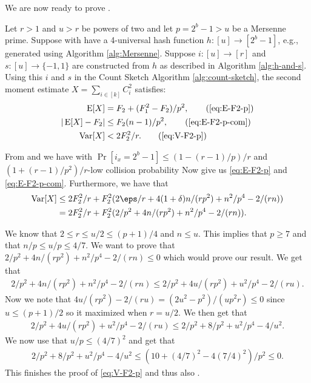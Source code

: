 We are now ready to prove .
\begingroup
    \def\thelemma{\ref{thm:h-and-s-p}}
    \begin{theorem}
        Let $r>1$ and $u>r$ be powers of two and let $p=2^b-1>u$ be a
        Mersenne prime.
        Suppose with have a 4-universal hash function $h:[u]\to[2^b-1]$, e.g.,
        generated using Algorithm \ref{alg:Mersenne}. Suppose
        $i:[u]\to[r]$ and
        $s:[u]\to\{-1,1\}$ are constructed from $h$ as described in
        Algorithm \ref{alg:h-and-s}. Using this $i$ and $s$ 
        in the Count Sketch Algorithm \ref{alg:count-sketch}, the second moment 
        estimate $X=\sum_{i\in[k]} C_i^2$ satisfies:
        \begin{align*}
           \E[X] &= F_2+(F_1^2-F_2)/p^2, \tag{\ref{eq:E-F2-p}}\\
           | \E[X] - F_2 | &\le F_2 (n - 1)/p^2, \tag{\ref{eq:E-F2-p-com}}\\
           \Var[X]&< 2F_2^2/r.\tag{\ref{eq:V-F2-p}}
        \end{align*}
    \end{theorem}
    \addtocounter{lemma}{-1}
\endgroup

From  and  we have
 with $
    \Pr[i_x = 2^b - 1] \le (1 - (r - 1)/p)/r$
   and  $(1 + (r - 1)/p^2)/r$-low collision probability
Now  give us \eqref{eq:E-F2-p}
and \eqref{eq:E-F2-p-com}. Furthermore, we have that
\begin{align*}
    \Var[X] 
        &\le 2F_2^2/r + F_2^2 (2\eps/r + 4(1 + \delta)n / (rp^2) + n^2/p^4 - 2 /(rn))
        \\&= 2F_2^2/r + F_2^2(2/p^2 + 4n/(r p^2) + n^2/p^4 - 2/(rn)) .
\end{align*}

We know that $2 \le r \le u/2 \le (p + 1)/4$ and $n \le u$.
This implies that $p \ge 7$ and that $n/p \le u/p \le 4/7$.
We want to prove that
$2/p^2 + 4n/(r p^2) + n^2/p^4 - 2/(rn) \le 0$ which would
prove our result. We get that
\begin{align*}
    2/p^2 + 4n/(r p^2) + n^2/p^4 - 2/(rn)
        \le 2/p^2 + 4u/(r p^2) + u^2/p^4 - 2/(ru) .
\end{align*}
Now we note that $4u/(r p^2) - 2/(ru) = (2u^2 - p^2)/(u p^2 r) \le 0$
since $u \le (p + 1)/2$ so it maximized when $r = u/2$. We then get
that
\begin{align*}
    2/p^2 + 4u/(r p^2) + u^2/p^4 - 2/(ru)
        \le 2/p^2 + 8/p^2 + u^2 / p^4 - 4/u^2 .
\end{align*}
We now use that $u/p \le (4/7)^2$ and get that
\begin{align*}
    2/p^2 + 8/p^2 + u^2 / p^4 - 4/u^2
        \le (10 + (4/7)^2 - 4 (7/4)^2)/p^2
        \le 0 .
\end{align*}
This finishes the proof of \eqref{eq:V-F2-p} and thus also .

